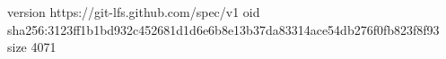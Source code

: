 version https://git-lfs.github.com/spec/v1
oid sha256:3123ff1b1bd932c452681d1d6e6b8e13b37da83314ace54db276f0fb823f8f93
size 4071
